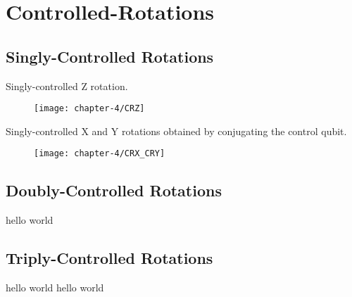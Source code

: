 \section{Controlled-Rotations}

\subsection{Singly-Controlled Rotations}
Singly-controlled Z rotation.

\begin{figure}[hb]
    \centering
    \texttt{[image: chapter-4/CRZ]}
\end{figure}

Singly-controlled X and Y rotations obtained by conjugating the control qubit.

\begin{figure}[hb]
    \centering
    \texttt{[image: chapter-4/CRX\_CRY]}
\end{figure}

\subsection{Doubly-Controlled Rotations}
hello world


\subsection{Triply-Controlled Rotations}
hello world
hello world

